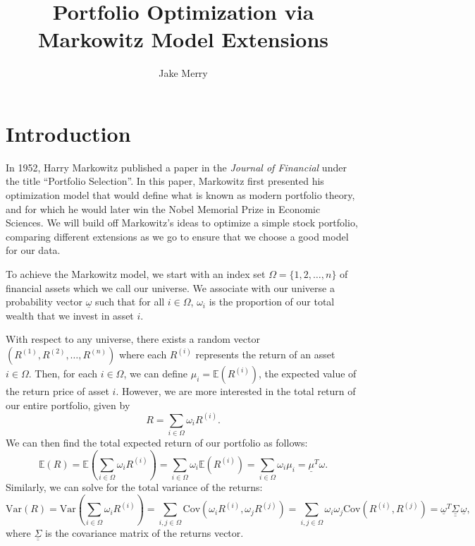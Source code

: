 \documentclass{article}
\newcommand{\E}{\mathbb{E}}
\newcommand{\Var}{\text{Var}}
\newcommand{\Cov}{\text{Cov}}
\renewcommand{\vec}[1]{\underline{#1}}
\newcommand{\mat}[1]{\underline{\underline{#1}}}
\theoremstyle{definition}
\begin{document}
\setlength{\parindent}{0pt}
\setlength{\parskip}{8pt}
\renewcommand\qedsymbol{$\blacksquare$}

\makeatletter
\renewcommand*\env@matrix[1][\arraystretch]{%
  \edef\arraystretch{#1}%
  \hskip -\arraycolsep
  \let\@ifnextchar\new@ifnextchar
  \array{*\c@MaxMatrixCols c}}
\makeatother

\title{Portfolio Optimization via Markowitz Model Extensions}
\author{Jake Merry}
\maketitle

\section{Introduction}

In 1952, Harry Markowitz published a paper in the \emph{Journal of Financial} under the title ``Portfolio Selection''. In this paper, Markowitz first presented his optimization model that would define what is known as modern portfolio theory, and for which he would later win the Nobel Memorial Prize in Economic Sciences. We will build off Markowitz's ideas to optimize a simple stock portfolio, comparing different extensions as we go to ensure that we choose a good model for our data. 

To achieve the Markowitz model, we start with an index set $\Omega = \{ 1, 2, \dots, n \}$ of financial assets which we call our universe. We associate with our universe a probability vector $\vec\omega$ such that for all $i \in \Omega$, $\omega_i$ is the proportion of our total wealth that we invest in asset $i$. 

With respect to any universe, there exists a random vector $(R^{(1)}, R^{(2)}, \dots, R^{(n)})$ where each $R^{(i)}$ represents the return of an asset $i \in \Omega$. Then, for each $i \in \Omega$, we can define $\mu_i = \E(R^{(i)})$, the expected value of the return price of asset $i$. However, we are more interested in the total return of our entire portfolio, given by
$$R = \sum_{i \in \Omega} \omega_i R^{(i)}.$$
We can then find the total expected return of our portfolio as follows:
$$\E(R) = \E\left( \sum_{i \in \Omega} \omega_i R^{(i)} \right) = \sum_{i \in \Omega} \omega_i \E(R^{(i)}) = \sum_{i \in \Omega} \omega_i \mu_i = \vec\mu^T\omega.$$
Similarly, we can solve for the total variance of the returns:
$$\Var(R) = \Var\left( \sum_{i \in \Omega} \omega_i R^{(i)} \right) = \sum_{i, j \in \Omega} \Cov(\omega_i R^{(i)}, \omega_j R^{(j)}) = \sum_{i, j \in \Omega} \omega_i \omega_j \Cov(R^{(i)}, R^{(j)}) = \vec\omega^T \mat\Sigma \, \vec\omega, $$
where $\mat\Sigma$ is the covariance matrix of the returns vector. 
\end{document}
